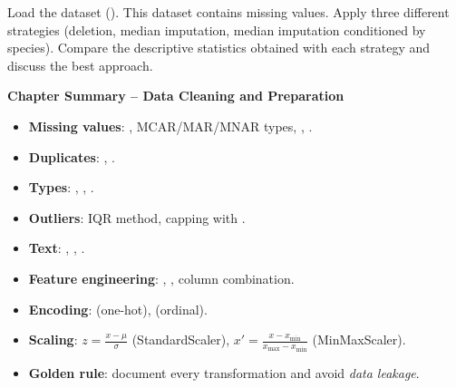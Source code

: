 \begin{exercise}[$\star\star\star$]
Load the  dataset (). This dataset contains missing values. Apply three different strategies (deletion, median imputation, median imputation conditioned by species). Compare the descriptive statistics obtained with each strategy and discuss the best approach.
\end{exercise}

\begin{keyformulas}
\textbf{Chapter Summary -- Data Cleaning and Preparation}
\begin{itemize}
    \item \textbf{Missing values}: , MCAR/MAR/MNAR types, , .
    \item \textbf{Duplicates}: , .
    \item \textbf{Types}: , , .
    \item \textbf{Outliers}: IQR method, capping with .
    \item \textbf{Text}: , , .
    \item \textbf{Feature engineering}: , , column combination.
    \item \textbf{Encoding}:  (one-hot),  (ordinal).
    \item \textbf{Scaling}: $z = \frac{x - \mu}{\sigma}$ (StandardScaler), $x' = \frac{x - x_{\min}}{x_{\max} - x_{\min}}$ (MinMaxScaler).
    \item \textbf{Golden rule}: document every transformation and avoid \emph{data leakage}.
\end{itemize}
\end{keyformulas}

